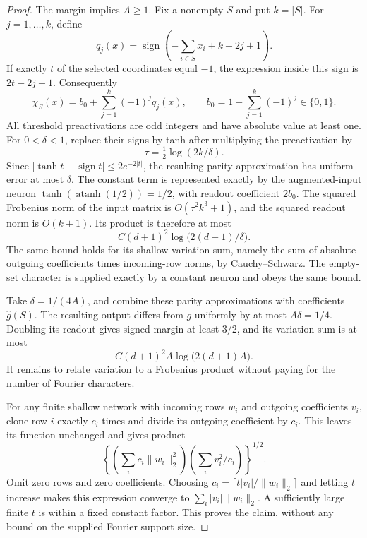 \begin{proof}
The margin implies $A\ge1$. Fix a nonempty $S$ and put $k=|S|$.
For $j=1,\ldots,k$, define
\[
 q_j(x)=\operatorname{sign}\left(-\sum_{i\in S}x_i+k-2j+1\right).
\]
If exactly $t$ of the selected coordinates equal $-1$, the expression
inside this sign is $2t-2j+1$. Consequently
\[
 \chi_S(x)=b_0+\sum_{j=1}^k(-1)^j q_j(x),
 \qquad b_0=1+\sum_{j=1}^k(-1)^j\in\{0,1\}.
\]
All threshold preactivations are odd integers and have absolute value
at least one. For $0<\delta<1$, replace their signs by tanh after
multiplying the preactivation by
\[
 \tau=\tfrac12\log(2k/\delta).
\]
Since $|\tanh t-\operatorname{sign}t|\le2e^{-2|t|}$, the resulting
parity approximation has uniform error at most $\delta$. The constant
term is represented exactly by the augmented-input neuron
$\tanh(\operatorname{atanh}(1/2))=1/2$, with readout coefficient $2b_0$.
The squared Frobenius norm of the input matrix is
$O(\tau^2k^3+1)$, and the squared readout norm is $O(k+1)$.
Its product is therefore at most
\[
 C(d+1)^2\log\bigl(2(d+1)/\delta\bigr).
\]
The same bound holds for its shallow variation sum, namely the sum of
absolute outgoing coefficients times incoming-row norms, by
Cauchy--Schwarz. The empty-set character is supplied exactly by a
constant neuron and obeys the same bound.

Take $\delta=1/(4A)$, and combine these parity approximations with
coefficients $\widehat g(S)$. The resulting output differs from $g$
uniformly by at most $A\delta=1/4$. Doubling its readout gives signed
margin at least $3/2$, and its variation sum is at most
\[
 C(d+1)^2 A\log\bigl(2(d+1)A\bigr).
\]
It remains to relate variation to a Frobenius product without paying
for the number of Fourier characters.

For any finite shallow network with incoming rows $w_i$ and outgoing
coefficients $v_i$, clone row $i$ exactly $c_i$ times and divide its
outgoing coefficient by $c_i$. This leaves its function unchanged and
gives product
\[
 \left\{\left(\sum_i c_i\|w_i\|_2^2\right)
             \left(\sum_i v_i^2/c_i\right)\right\}^{1/2}.
\]
Omit zero rows and zero coefficients. Choosing
$c_i=\lceil t|v_i|/\|w_i\|_2\rceil$ and letting $t$ increase makes
this expression converge to $\sum_i|v_i|\|w_i\|_2$.
A sufficiently large finite $t$ is within a fixed constant factor.
This proves the claim, without any bound on the supplied Fourier
support size.
\end{proof}

